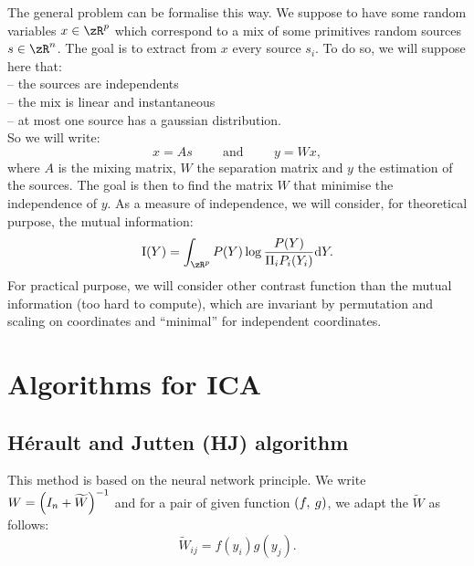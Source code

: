 \documentclass[10pt, a4paper, twocolumn]{article}
\newcommand{\mysection}[1]{\vspace{-0pt}\section{#1}\vspace{0pt}}
\newcommand{\mysubsection}[1]{\vspace{-7pt}\subsection{\normalsize #1}\vspace{-2pt}}
\newcommand{\zZ}[2]{\mathrm #1\!\zp{#2}}
\begin{document}
The general problem can be formalise this way.
We suppose to have some random variables $x\in\zR^p$ which correspond to
a mix of some primitives random sources $s\in\zR^n$. The goal is to extract
from $x$ every source $s_i$. To do so, we will suppose here that:\\
-- the sources are independents\\
-- the mix is linear and instantaneous\\
-- at most one source has a gaussian distribution.\\
So we will write: \begin{equation}
  x = A s\hspace{1cm}\mbox{and}\hspace{1cm}y = W x,
\end{equation}
where $A$ is the mixing matrix, $W$ the separation matrix and $y$ the
estimation of the sources. The goal is then to find the matrix $W$ that
minimise the independence of $y$.
As a measure of independence, we will consider, for theoretical purpose,
the mutual information:\begin{equation}
  \zZ IY = \int_{\zR^p} P(Y) \log\frac{P(Y)}{\Pi_i P_i(Y_i)} \zdx Y.
\end{equation}
For practical purpose, we will consider other contrast function than the
mutual information (too hard to compute), which are invariant by permutation
and scaling on coordinates and ``minimal'' for independent coordinates.



\mysection{Algorithms for ICA}
\mysubsection{Hérault and Jutten (HJ) algorithm}
This method is based on the neural network principle.
We write $W = \zp{I_n+\widetilde W}^{-1}$ and for a pair of given function $\zp{f,\:g}$, we adapt the $\widetilde W$ as follows:\begin{equation}
\widetilde W_{ij} = f(y_i) g(y_j).
\end{equation}
\end{document}
